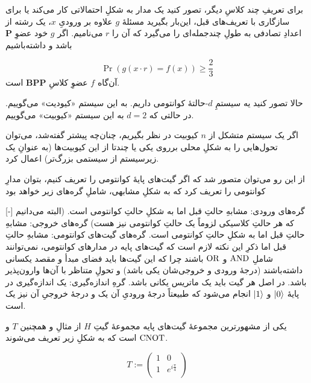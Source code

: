 برای تعریفِ چند کلاسِ دیگر، تصور کنید یک مدار به شکلِ احتمالاتی کار می‌کند یا برای سازگاری با تعریف‌های قبل، این‌بار بگیرید مسئلهٔ \(g\) علاوه بر ورودیِ \(x\)، یک رشته از اعدادِ تصادفی به طولِ چندجمله‌ای را می‌گیرد که آن را \(r\) می‌نامیم. اگر \(g\) خود عضوِ 
\( \mathbf{P} \) 
باشد و داشته‌باشیم

\begin{equation}
    \Pr(g(x \cdot r) = f(x)) \ge \frac{2}{3}
\end{equation} 
آن‌گاه \(f\) عضوِ کلاسِ 
\( \mathbf{BPP} \)
است. 
 
 
حالا تصور کنید یه سیستمِ \(d\)-حالتهٔ 
کوانتومی داریم. به این سیستم «کیودیت» می‌گوییم. در حالتی که 
\(d=2\)
به این سیستم «کیوبیت» می‌گوییم.

اگر یک سیستم متشکل از \(n\) کیوبیت در نظر بگیریم، چنان‌چه پیشتر گفته‌شد، می‌توان تحول‌هایی را به شکلِ محلی برروی یکی یا چندتا از این کیوبیت‌ها (به عنوانِ یک زیرسیستم از سیستمی بزرگ‌تر) اعمال کرد.

از این رو می‌توان متصور شد که اگر گیت‌های پایهٔ کوانتومی را تعریف کنیم، بتوان مدارِ کوانتومی را تعریف کرد که به شکلِ مشابهی، شاملِ گره‌های زیر خواهد بود 

[-]
 گره‌های ورودی: مشابهِ حالتِ قبل اما به شکلِ حالتِ کوانتومی است. (البته می‌دانیم که هر حالتِ کلاسیکی لزوماً یک حالتِ کوانتومی نیز هست)
 گره‌های خروجی: مشابهِ حالتِ قبل اما به شکلِ حالتِ کوانتومی است.
 گره‌های گیت‌های کوانتومی: مشابهِ حالتِ قبل اما ذکرِ این نکته لازم است که گیت‌های پایه در مدارهای کوانتومی، نمی‌توانند شاملِ
\(\operatorname{AND}\)
و
\(\operatorname{OR}\)
باشند چرا که این گیت‌ها باید فضای مبدأ و مقصد یکسانی داشته‌باشند (درجهٔ ورودی و خروجی‌شان یکی باشد) و تحولِ متناظر با آن‌ها وارون‌پذیر باشد. در اصل هر گیت باید یک ماتریس یکانی باشد.
 گرهِ اندازه‌گیری: یک اندازه‌گیری در پایهٔ 
\( \ket{0} \)
و 
\( \ket{1} \)
انجام می‌شود که طبیعتاً درجهٔ ورودیِ آن یک و درجهٔ خروجیِ آن نیز یک است.


یکی از مشهورترین مجموعهٔ گیت‌های پایه مجموعهٔ گیتِ \(H\) از مثالِ  و همچنین \(T\) و \(\operatorname{CNOT}\)
است که به شکلِ زیر تعریف می‌شوند. 

\begin{equation}
    T := \begin{pmatrix}
        1 & 0 \\
        1 & e^{i\frac{\pi}{4}} \\
    \end{pmatrix}
\end{equation}

